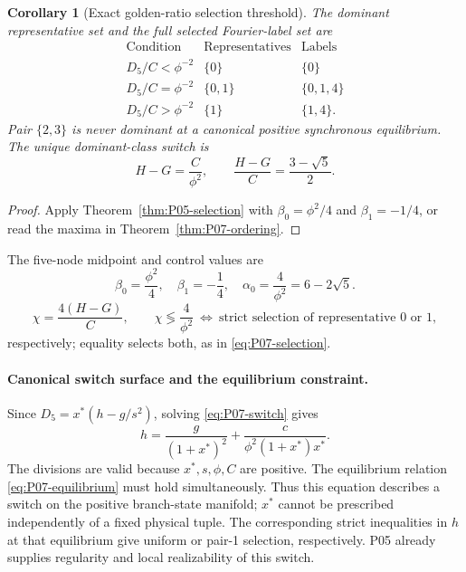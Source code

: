 \documentclass[11pt]{article}
\newtheorem{corollary}[theorem]{Corollary}
\theoremstyle{definition}
\theoremstyle{remark}
\begin{document}
\begin{corollary}[Exact golden-ratio selection threshold]
\label{cor:P07-selection}
The dominant representative set and the full selected Fourier-label set are
\begin{equation}
\begin{array}{c|c|c}
\text{Condition}&\text{Representatives}&\text{Labels}\\\hline
D_5/C<\phi^{-2}&\{0\}&\{0\}\\
D_5/C=\phi^{-2}&\{0,1\}&\{0,1,4\}\\
D_5/C>\phi^{-2}&\{1\}&\{1,4\}.
\end{array}
\label{eq:P07-selection}
\end{equation}
Pair $\{2,3\}$ is never dominant at a canonical positive synchronous
 equilibrium. The unique dominant-class switch is
\begin{equation}
 \boxed{H-G=\frac{C}{\phi^2},\qquad
         \frac{H-G}{C}=\frac{3-\sqrt5}{2}.}
 \label{eq:P07-switch}
\end{equation}
\end{corollary}
\begin{proof}
Apply Theorem~\ref{thm:P05-selection} with
$\beta_0=\phi^2/4$ and $\beta_1=-1/4$, or read the maxima
in Theorem~\ref{thm:P07-ordering}.
\end{proof}


The five-node midpoint and control values are
\begin{equation}
 \beta_0=\frac{\phi^2}{4},\quad\beta_1=-\frac14,
 \quad\alpha_0=\frac4{\phi^2}=6-2\sqrt5.
 \label{eq:P07-midpoints}
\end{equation}
\begin{equation}
 \chi=\frac{4(H-G)}C,\qquad
 \chi\lessgtr\frac4{\phi^2}\ \Longleftrightarrow\
 \text{strict selection of representative }0\text{ or }1,
 \label{eq:P07-chi}
\end{equation}
respectively; equality selects both, as in \eqref{eq:P07-selection}.

\paragraph{Canonical switch surface and the equilibrium constraint.}
Since $D_5=x^*(h-g/s^2)$, solving \eqref{eq:P07-switch} gives
\begin{equation}
 \boxed{h=\frac{g}{(1+x^*)^2}
            +\frac{c}{\phi^2(1+x^*)x^*}.}
 \label{eq:P07-canonical-switch}
\end{equation}
The divisions are valid because $x^*,s,\phi,C$ are positive.
The equilibrium relation \eqref{eq:P07-equilibrium} must hold
simultaneously. Thus this equation describes a switch on the positive
branch-state manifold; $x^*$ cannot be prescribed independently of
a fixed physical tuple. The corresponding strict inequalities in $h$
at that equilibrium give uniform or pair-1 selection, respectively.
P05 already supplies regularity and local realizability of this switch.
\end{document}
